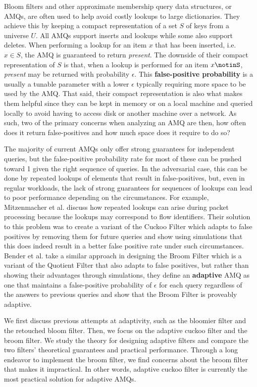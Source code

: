 \documentclass[../paper.tex]{subfiles}
\begin{document}
    Bloom filters and other approximate membership query data structures, or
    AMQs, are often used to help avoid costly lookups to large dictionaries.
    They achieve this by keeping a compact representation of a set
    $S$ of keys from a universe $U$.  All AMQs support inserts and lookups
    while some also support deletes.  When performing a lookup for an item $x$
    that has been inserted, i.e. $x\in S$, the AMQ is guaranteed to return
    {\it present}.  The downside of their compact representation of $S$ is
    that, when a lookup is performed for an item $x \notinS$, {\it present}
    may be returned with probability $\epsilon$.  This {\bf false-positive
    probability} is a usually a tunable parameter with a lower $\epsilon$
    typically requiring more space to be used by the AMQ.  That said, their
    compact representation is also what makes them helpful since they can be
    kept in memory or on a local machine and queried locally to avoid having to
    access disk or another machine over a network.  As such, two of the primary
    concerns when analyzing an AMQ are then, how often does it return
    false-positives and how much space does it require to do so?

    The majority of current AMQs only offer strong guarantees for independent
    queries, but the false-positive probability rate for most of these can be
    pushed toward 1 given the right sequence of queries.  In the adversarial
    case, this can be done by repeated lookups of elements that result in
    false-positives, but, even in regular workloads, the lack of strong
    guarantees for sequences of lookups can lead to poor performance depending
    on the circumstances.  For example, Mitzenmacher et al.
    \cite{adaptive-cuckoo} discuss how repeated lookups can arise during packet
    processing because the lookups may correspond to flow identifiers.  Their
    solution to this problem was to create a variant of the Cuckoo Filter
    \cite{cuckoo-filter} which adapts to false positives by removing them for
    future queries and show using simulations that this does indeed result in a
    better false positive rate under such circumstances.  Bender et al.
    \cite{broom-filter} take a similar approach in designing the Broom Filter
    which is a variant of the Quotient Filter \cite{quotient-filter} that also
    adapts to false positives, but rather than showing their advantages through
    simulations, they define an {\bf adaptive} AMQ as one that maintains a
    false-positive probability of $\epsilon$ for each query regardless of the
    answers to previous queries and show that the Broom Filter is proveably
    adaptive.

    We first discuss previous attempts at adaptivity, such as the bloomier filter
    and the retouched bloom filter. Then, we focus on the adaptive cuckoo filter
    and the broom filter. We study the theory for designing adaptive filters and
    compare the two filters' theoretical guarantees and practical performance.
    Through a long endeavor to implement the broom filter, we find concerns about
    the broom filter that makes it impractical. In other words, adaptive cuckoo
    filter is currently the most practical solution for adaptive AMQs.
\end{document}
